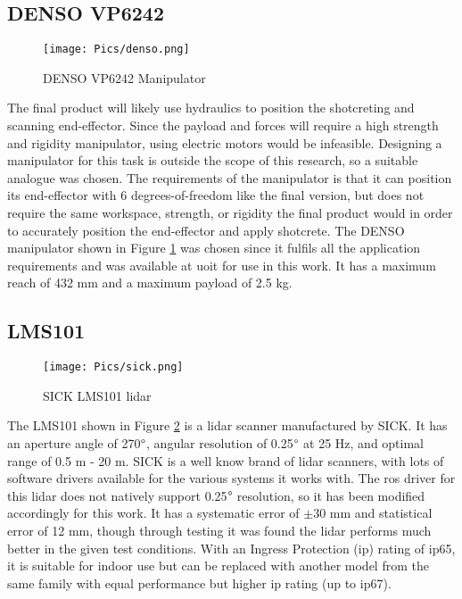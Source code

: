 \subsection{DENSO VP6242}
\begin{figure}[H]
    \centering
    \texttt{[image: Pics/denso.png]}
    \caption{DENSO VP6242 Manipulator \cite{densopage}}
    \label{fig:densofig}
\end{figure}
The final product will likely use hydraulics to position the shotcreting and scanning end-effector. Since the payload and forces will require a high strength and rigidity manipulator, using electric motors would be infeasible. Designing a manipulator for this task is outside the scope of this research, so a suitable analogue was chosen. The requirements of the manipulator is that it can position its end-effector with 6 degrees-of-freedom like the final version, but does not require the same workspace, strength, or rigidity the final product would in order to accurately position the end-effector and apply shotcrete. The DENSO manipulator shown in Figure \ref{fig:densofig} was chosen since it fulfils all the application requirements and was available at \acrshort{uoit} for use in this work. It has a maximum reach of 432 mm and a maximum payload of 2.5 kg.\\ 
\subsection{LMS101}

\begin{figure}[H]
    \centering
    \texttt{[image: Pics/sick.png]}
    \caption{SICK LMS101 \acrshort{lidar} \cite{sickpage}}
    \label{fig:sick}
\end{figure}
The LMS101 shown in Figure \ref{fig:sick} is a \acrshort{lidar} scanner manufactured by SICK. It has an aperture angle of 270$\degree$, angular resolution of 0.25$\degree$ at 25 Hz, and optimal range of 0.5 m - 20 m. SICK is a well know brand of \acrshort{lidar} scanners, with lots of software drivers available for the various systems it works with. The \acrshort{ros} driver for this \acrshort{lidar} does not natively support 0.25$\degree$ resolution, so it has been modified accordingly for this work. It has a systematic error of $\pm$30 mm and statistical error of 12 mm, though through testing it was found the \acrshort{lidar} performs much better in the given test conditions. With an Ingress Protection (\acrshort{ip}) rating of \acrshort{ip}65, it is suitable for indoor use but can be replaced with another model from the same family with equal performance but higher \acrshort{ip} rating (up to \acrshort{ip}67).\\
